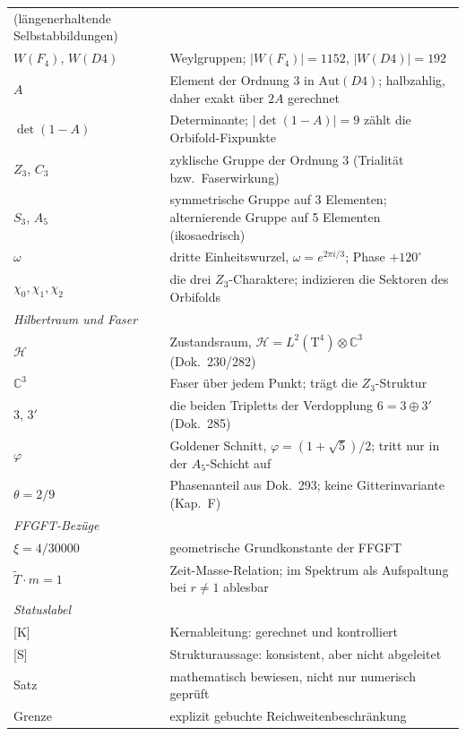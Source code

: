 \begin{center}
{\begin{longtable}{lp{9.6cm}}
  (längenerhaltende Selbstabbildungen) \\
$W(F_4)$, $W(D4)$ & Weylgruppen; $|W(F_4)| = 1152$,
  $|W(D4)| = 192$ \\
$A$ & Element der Ordnung 3 in $\text{Aut}(D4)$; halbzahlig, daher
  exakt über $2A$ gerechnet \\
$\det(1-A)$ & Determinante; $|\det(1-A)| = 9$ zählt die
  Orbifold-Fixpunkte \\
$Z_3$, $C_3$ & zyklische Gruppe der Ordnung 3 (Trialität bzw.\
  Faserwirkung) \\
$S_3$, $A_5$ & symmetrische Gruppe auf 3 Elementen; alternierende
  Gruppe auf 5 Elementen (ikosaedrisch) \\
$\omega$ & dritte Einheitswurzel, $\omega = e^{2\pi i/3}$;
  Phase $+120^\circ$ \\
$\chi_0,\chi_1,\chi_2$ & die drei $Z_3$-Charaktere; indizieren die
  Sektoren des Orbifolds \\
\midrule
\multicolumn{2}{l}{\textit{Hilbertraum und Faser}} \\
$\mathcal{H}$ & Zustandsraum,
  $\mathcal{H} = L^2(\text{T}^4)\otimes\mathbb{C}^3$
  (Dok.~230/282) \\
$\mathbb{C}^3$ & Faser über jedem Punkt; trägt die
  $Z_3$-Struktur \\
$3$, $3'$ & die beiden Tripletts der Verdopplung
  $6 = 3\oplus3'$ (Dok.~285) \\
$\varphi$ & Goldener Schnitt, $\varphi = (1+\sqrt5)/2$; tritt nur
  in der $A_5$-Schicht auf \\
$\theta = 2/9$ & Phasenanteil aus Dok.~293; keine Gitterinvariante
  (Kap.~F) \\
\midrule
\multicolumn{2}{l}{\textit{FFGFT-Bezüge}} \\
$\xi = 4/30000$ & geometrische Grundkonstante der FFGFT \\
$\tilde T\cdot m = 1$ & Zeit-Masse-Relation; im Spektrum als
  Aufspaltung bei $r \ne 1$ ablesbar \\
\midrule
\multicolumn{2}{l}{\textit{Statuslabel}} \\
{}[K] & Kernableitung: gerechnet und kontrolliert \\
{}[S] & Strukturaussage: konsistent, aber nicht abgeleitet \\
Satz & mathematisch bewiesen, nicht nur numerisch geprüft \\
Grenze & explizit gebuchte Reichweitenbeschränkung \\
\end{longtable}
}
\end{center}

